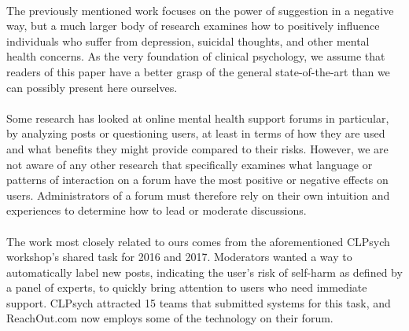 \documentclass{article}
\begin{document}
\paragraph{}The previously mentioned work focuses on the power of suggestion in a negative way, but a much larger body of research examines how to positively influence individuals who suffer from depression, suicidal thoughts, and other mental health concerns. As the very foundation of clinical psychology, we assume that readers of this paper have a better grasp of the general state-of-the-art than we can possibly present here ourselves.

\paragraph{}Some research has looked at online mental health support forums in particular, by analyzing posts or questioning users, at least in terms of how they are used and what benefits they might provide compared to their risks. However, we are not aware of any other research that specifically examines what language or patterns of interaction on a forum have the most positive or negative effects on users. Administrators of a forum must therefore rely on their own intuition and experiences to determine how to lead or moderate discussions.

\paragraph{}The work most closely related to ours comes from the aforementioned CLPsych workshop's shared task for 2016 and 2017. Moderators wanted a way to automatically label new posts, indicating the user's risk of self-harm as defined by a panel of experts, to quickly bring attention to users who need immediate support. CLPsych attracted 15 teams that submitted systems for this task, and ReachOut.com now employs some of the technology on their forum\cite{milne}\cite{cohan2}.
\end{document}
